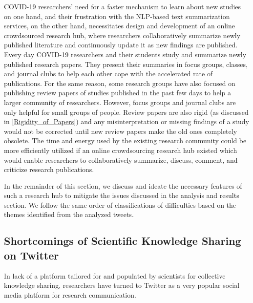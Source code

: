 \documentclass[acmsmall,authordraft]{acmart}
\begin{document}
COVID-19 researchers' need for a faster mechanism to learn about new studies on one hand, and their frustration with the NLP-based text summarization services, on the other hand, necessitates design and development of an online crowdsourced research hub, where researchers collaboratively summarize newly published literature and continuously update it as new findings are published. Every day COVID-19 researchers and their students study and summarize newly published research papers. They present their summaries in focus groups, classes, and journal clubs to help each other cope with the accelerated rate of publications. For the same reason, some research groups have also focused on publishing review papers of studies published in the past few days to help a larger community of researchers. However, focus groups and journal clubs are only helpful for small groups of people. Review papers are also rigid (as discussed in \autoref{Rigidity_of_Papers}) and any misinterpretation or missing findings of a study would not be corrected until new review papers make the old ones completely obsolete. The time and energy used by the existing research community could be more efficiently utilized if an online crowdsourcing research hub existed which would enable researchers to collaboratively summarize, discuss, comment, and criticize research publications.

In the remainder of this section, we discuss and ideate the necessary features of such a research hub to mitigate the issues discussed in the analysis and results section. We follow the same order of classifications of difficulties based on the themes identified from the analyzed tweets.

\subsection{Shortcomings of Scientific Knowledge Sharing on Twitter}
\label{Shortcomings of Scientific Knowledge Sharing on Twitter}

In lack of a platform tailored for and populated by scientists for collective knowledge sharing, researchers have turned to Twitter as a very popular social media platform for research communication.
\end{document}
